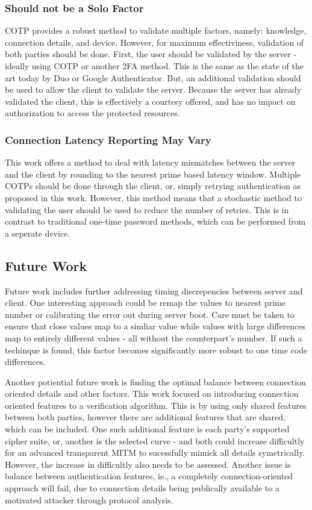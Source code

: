 \documentclass[a4paper, 11pt]{article} 				%
\begin{document}
\subsubsection{Should not be a Solo Factor}
COTP provides a robust method to validate multiple factors, namely: knowledge, connection details, and device. However, for maximum effectiviness, validation of both parties should be done. First, the user should be validated by the server - ideally using COTP or another 2FA method. This is the same as the state of the art today by Duo or Google Authenticator. But, an additional validation should be used to allow the client to validate the server. Because the server has already validated the client, this is effectively a courtesy offered, and has no impact on authorization to access the protected resources.

\subsubsection{Connection Latency Reporting May Vary}
This work offers a method to deal with latency mismatches between the server and the client by rounding to the nearest prime based latency window. Multiple COTPs should be done through the client, or, simply retrying authentication as proposed in this work. However, this method means that a stochastic method to validating the user should be used to reduce the number of retries. This is in contrast to traditional one-time password methods, which can be performed from a seperate device. 

\subsection{Future Work}
Future work includes further addressing timing discrepencies between server and client. One interesting approach could be remap the values to nearest prime number or calibrating the error out during server boot. Care must be taken to ensure that close values map to a simliar value while values with large differences map to entirely different values - all without the counterpart's number. If such a techinque is found, this factor becomes significantly more robust to one time code differences.

Another potiential future work is finding the optimal balance between connection oriented details and other factors. This work focused on introducing connection oriented features to a verification algorithm. This is by using only shared features between both parties, however there are additional features that are shared, which can be included. One such additional feature is each party's supported cipher suite, or, another is the selected curve - and both could increase difficultly for an advanced transparent MITM to sucessfully mimick all details symetrically. However, the increase in difficultly also needs to be assessed. Another issue is balance between authentication features, ie., a completely connection-oriented approach will fail, due to connection details being publically available to a motivated attacker through protocol analysis.
\end{document}
